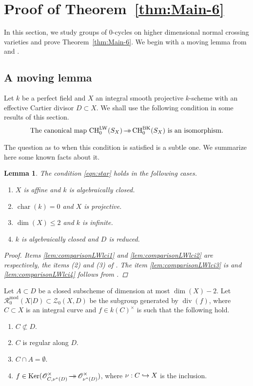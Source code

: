 \documentclass[JEP,XML,SOM,Unicode,published]{cedram}
\let\mathcal\mathscr
\def\hto{\mathrel{\lhook\joinrel\to}}
\newcommand{\onto}{\mathchoice{\to\hspace*{-5mm}\to}{\hspace*{-.5mm}\to\hspace*{-2.85mm}\to\hspace*{-.5mm}}{\to\hspace*{-3mm}\to}{\to\hspace*{-3mm}\to}}
\let\surj\onto
\let\inj\hto
\newcommand{\BK}{\mathrm{BK}}
\newcommand{\LW}{\mathrm{LW}}
\newcommand{\rmod}{\mathrm{mod}}
\newtheorem{lem}[thm]{Lemma}
\theoremstyle{definition}
\newcommand{\thmref}{Theorem~\ref}
\newcommand{\sO}{{\mathcal O}}\let\cO\sO
\newcommand{\sR}{{\mathcal R}}
\newcommand{\sZ}{{\mathcal Z}}
\DeclareMathOperator{\CH}{CH}
\DeclareMathOperator{\Char}{char}
\DeclareMathOperator{\divf}{div}
\DeclareMathOperator{\Ker}{Ker}
\begin{document}
\section{Proof of \thmref{thm:Main-6}}
\label{sec:high-dim}
In this section, we study groups of $0$-cycles on higher
dimensional normal crossing varieties and prove \thmref{thm:Main-6}.
We begin with a moving lemma from \cite{BK} and \cite{GKR}.

\subsection{A moving lemma}\label{sec:ML}
Let $k$ be a perfect field and $X$ an integral smooth projective
$k$-scheme with an effective Cartier divisor $D \subset X$.
We shall use the following condition in some results of this section.
\begin{equation}\label{eqn:star}
\mbox{The canonical map $\CH^{\LW}_0(S_X) \surj \CH_0^{\BK}(S_X)$ is an isomorphism}.
\end{equation}

The question as to when this condition is satisfied is a subtle one.
We summarize here some known facts about it.

\pagebreak[2]%
\begin{lem} \label{lem:comparisonLWlci}
The condition \eqref{eqn:star} holds in the following cases.
\begin{enumerate}
\item\label{lem:comparisonLWlci1} $X$ is affine and $k$ is algebraically closed.
\item\label{lem:comparisonLWlci2} $\Char(k)=0$ and $X$ is projective.
\item\label{lem:comparisonLWlci3} $\dim(X)\leq 2$ and $k$ is infinite.
\item\label{lem:comparisonLWlci4} $k$ is algebraically closed and $D$ is reduced.
\end{enumerate}
\begin{proof}
Items \eqref{lem:comparisonLWlci1} and \eqref{lem:comparisonLWlci2} are respectively, the items (2) and (3) of
\cite[Th.\,3.17]{BK}. The item \eqref{lem:comparisonLWlci3} is \cite[Cor.\,7.8]{BKS} and
\eqref{lem:comparisonLWlci4} follows from \cite[Th.\,6.6]{Krishna-2}.
\end{proof}
\end{lem}

Let $A \subset D$ be a closed subscheme of dimension
at most $\dim(X) - 2$.
Let $\sR^{\rmod}_0(X|D) \subset \sZ_0(X, D)$ be the subgroup generated by
$\divf(f)$, where $C \subset X$ is an integral curve
and $f \in k(C)^{\times}$ is such that the following hold.
\begin{enumerate}
\item
$C \not\subset D$.
\item
$C$ is regular along $D$.
\item
$C \cap A = \emptyset$.
\item
$f \in \Ker(\sO^{\times}_{C,\nu^*(D)} \surj \sO^{\times}_{\nu^*(D)})$, where
$\nu: C \inj X$ is the inclusion.
\end{enumerate}
\end{document}
